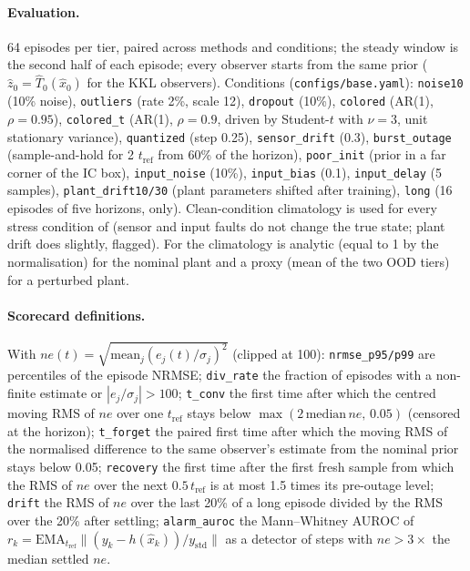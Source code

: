 \paragraph{Evaluation.} 64 episodes per tier, paired across methods and conditions; the steady window is the second half of each episode; every observer starts from the same prior ($\hat z_0=\hat T_0(\hat x_0)$ for the KKL observers). Conditions (\texttt{configs/base.yaml}): \texttt{noise10} (10\% noise), \texttt{outliers} (rate 2\%, scale 12), \texttt{dropout} (10\%), \texttt{colored} (AR(1), $\rho=0.95$), \texttt{colored\_t} (AR(1), $\rho=0.9$, driven by Student-$t$ with $\nu=3$, unit stationary variance), \texttt{quantized} (step 0.25), \texttt{sensor\_drift} (0.3), \texttt{burst\_outage} (sample-and-hold for 2 $t_\mathrm{ref}$ from 60\% of the horizon), \texttt{poor\_init} (prior in a far corner of the IC box), \texttt{input\_noise} (10\%), \texttt{input\_bias} (0.1), \texttt{input\_delay} (5 samples), \texttt{plant\_drift10/30} (plant parameters shifted after training), \texttt{long} (16 episodes of five horizons,  only). Clean-condition climatology is used for every stress condition of  (sensor and input faults do not change the true state; plant drift does slightly, flagged). For  the climatology is analytic (equal to 1 by the normalisation) for the nominal plant and a proxy (mean of the two OOD tiers) for a perturbed plant.

\paragraph{Scorecard definitions.} With $ne(t)=\sqrt{\mathrm{mean}_j(e_j(t)/\sigma_j)^2}$ (clipped at 100): \texttt{nrmse\_p95/p99} are percentiles of the episode NRMSE; \texttt{div\_rate} the fraction of episodes with a non-finite estimate or $|e_j/\sigma_j|>100$; \texttt{t\_conv} the first time after which the centred moving RMS of $ne$ over one $t_\mathrm{ref}$ stays below $\max(2\,\mathrm{median}\,ne,\,0.05)$ (censored at the horizon); \texttt{t\_forget} the paired first time after which the moving RMS of the normalised difference to the same observer's estimate from the nominal prior stays below 0.05; \texttt{recovery} the first time after the first fresh sample from which the RMS of $ne$ over the next $0.5\,t_\mathrm{ref}$ is at most 1.5 times its pre-outage level; \texttt{drift} the RMS of $ne$ over the last 20\% of a long episode divided by the RMS over the 20\% after settling; \texttt{alarm\_auroc} the Mann--Whitney AUROC of $r_k=\mathrm{EMA}_{t_\mathrm{ref}}\|(y_k-h(\hat x_k))/y_\mathrm{std}\|$ as a detector of steps with $ne>3\times$ the median settled $ne$.


